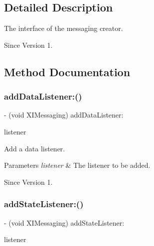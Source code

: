 \subsection{Detailed Description}
The interface of the messaging creator. 

\begin{DoxySince}{Since}
Version 1. 
\end{DoxySince}


\subsection{Method Documentation}
\hypertarget{protocol_x_i_messaging_01-p_a7883758cbf4e863c78367c5c8b46571a}{}\label{protocol_x_i_messaging_01-p_a7883758cbf4e863c78367c5c8b46571a} 
\subsubsection{\texorpdfstring{add\+Data\+Listener\+:()}{addDataListener:()}}
{\footnotesize\ttfamily -\/ (void X\+I\+Messaging) add\+Data\+Listener\+: \begin{DoxyParamCaption}\item[{(id$<$ X\+I\+Messaging\+Data\+Listener $>$)}]{listener }\end{DoxyParamCaption}}



Add a data listener. 


\begin{DoxyParams}{Parameters}
{\em listener} & The listener to be added. \\
\hline
\end{DoxyParams}
\begin{DoxySince}{Since}
Version 1. 
\end{DoxySince}
\hypertarget{protocol_x_i_messaging_01-p_a010a800e4b356ec9f07ae64764c64b18}{}\label{protocol_x_i_messaging_01-p_a010a800e4b356ec9f07ae64764c64b18} 
\subsubsection{\texorpdfstring{add\+State\+Listener\+:()}{addStateListener:()}}
{\footnotesize\ttfamily -\/ (void X\+I\+Messaging) add\+State\+Listener\+: \begin{DoxyParamCaption}\item[{(id$<$ X\+I\+Messaging\+State\+Listener $>$)}]{listener }\end{DoxyParamCaption}}



